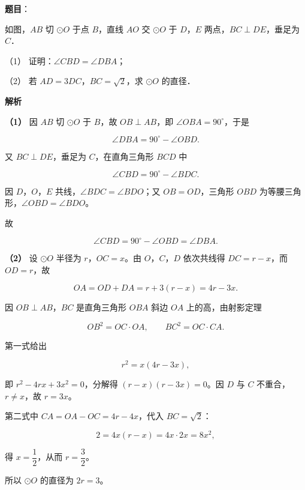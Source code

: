 \begin{answer}

\textbf{题目}：

如图，$AB$ 切 $\odot O$ 于点 $B$，直线 $AO$ 交 $\odot O$ 于 $D$，$E$ 两点，$BC\perp DE$，垂足为 $C$．

（1） 证明：$\angle CBD=\angle DBA$；

（2） 若 $AD=3DC$，$BC=\sqrt{2}$，求 $\odot O$ 的直径．
\nopagebreak[4]
\begin{center}\end{center}
\nopagebreak[4]
\textbf{解析}

\textbf{（1）} 因 $AB$ 切 $\odot O$ 于 $B$，故 $OB\perp AB$，即 $\angle OBA=90^{\circ}$，于是

\nopagebreak[4]
\[
\angle DBA=90^{\circ}-\angle OBD.
\]

又 $BC\perp DE$，垂足为 $C$，在直角三角形 $BCD$ 中

\nopagebreak[4]
\[
\angle CBD=90^{\circ}-\angle BDC.
\]

因 $D$，$O$，$E$ 共线，$\angle BDC=\angle BDO$；又 $OB=OD$，三角形 $OBD$ 为等腰三角形，$\angle OBD=\angle BDO$。

故

\nopagebreak[4]
\[
\angle CBD=90^{\circ}-\angle OBD=\angle DBA.
\]

\textbf{（2）} 设 $\odot O$ 半径为 $r$，$OC=x$。由 $O$，$C$，$D$ 依次共线得 $DC=r-x$，而 $OD=r$，故

\nopagebreak[4]
\[
OA=OD+DA=r+3(r-x)=4r-3x.
\]

因 $OB\perp AB$，$BC$ 是直角三角形 $OBA$ 斜边 $OA$ 上的高，由射影定理

\nopagebreak[4]
\[
OB^{2}=OC\cdot OA,\qquad BC^{2}=OC\cdot CA.
\]

第一式给出

\nopagebreak[4]
\[
r^{2}=x(4r-3x),
\]

即 $r^{2}-4rx+3x^{2}=0$，分解得 $(r-x)(r-3x)=0$。因 $D$ 与 $C$ 不重合，$r\ne x$，故 $r=3x$。

第二式中 $CA=OA-OC=4r-4x$，代入 $BC=\sqrt{2}$：

\nopagebreak[4]
\[
2=4x(r-x)=4x\cdot 2x=8x^{2},
\]

得 $x=\dfrac{1}{2}$，从而 $r=\dfrac{3}{2}$。

所以 $\odot O$ 的直径为 $2r=3$。



\end{answer}
